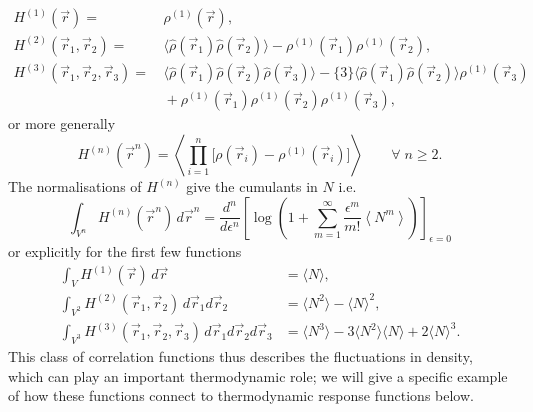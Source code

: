 \begin{subequations}\label{eq:density-density-correlations}
  \begin{align}
    H^{(1)}(\vec{r})
    =& \,
    \rho^{(1)}(\vec{r}),
    \\
    H^{(2)}(\vec{r}_1, \vec{r}_2)
    =& \,
    \big\langle \widehat\rho(\vec{r}_1) \widehat\rho(\vec{r}_2) \big\rangle
    - \rho^{(1)}(\vec{r}_1) \rho^{(1)}(\vec{r}_2),
    \label{eq:pair-density-density-correlation}
    \\
    H^{(3)}(\vec{r}_1, \vec{r}_2, \vec{r}_3)
    =& \,
    \big\langle \widehat\rho(\vec{r}_1) \widehat\rho(\vec{r}_2) \widehat\rho(\vec{r}_3) \big\rangle
    - \{3\} \big\langle \widehat\rho(\vec{r}_1) \widehat\rho(\vec{r}_2) \big\rangle \rho^{(1)}(\vec{r}_3)
    \nonumber \\ & \,
    + \rho^{(1)}(\vec{r}_1) \rho^{(1)}(\vec{r}_2) \rho^{(1)}(\vec{r}_3),
  \end{align}
\end{subequations}
or more generally \cite{Hansen2013}
\begin{equation}\label{eq:density-density-correlations}
  H^{(n)}(\vec{r}^n)
  =
  \left\langle
  \prod_{i=1}^n
  \Big[ \rho(\vec{r}_i) - \rho^{(1)}(\vec{r}_i) \Big]
  \right\rangle
  \qquad \forall \; n \ge 2.
\end{equation}
The normalisations of $H^{(n)}$ give the cumulants in $N$ i.e.\
\begin{equation*}
  \int_{V^n} H^{(n)}(\vec{r}^n) \, d\vec{r}^n
  =
  \frac{d^n}{d\epsilon^n}
  \left[
  \log{\left(
      1 + \sum_{m=1}^\infty
      \frac{\epsilon^m}{m!} \left\langle N^m \right\rangle
      \right)}
  \right]_{\epsilon = 0}
\end{equation*}
or explicitly for the first few functions
\begin{subequations}
  \begin{align}
    \int_V H^{(1)}(\vec{r}) \, d\vec{r}
    &=
    \langle N \rangle,
    \\
    \int_{V^2} H^{(2)}(\vec{r}_1, \vec{r}_2) \, d\vec{r}_1 d\vec{r}_2
    &=
    \langle N^2 \rangle - \langle N \rangle^2,
    \label{eq:pair-density-density-norm}
    \\
    \int_{V^3} H^{(3)}(\vec{r}_1, \vec{r}_2, \vec{r}_3) \, d\vec{r}_1 d\vec{r}_2 d\vec{r}_3
    &=
    \langle N^3 \rangle
    - 3 \langle N^2 \rangle \langle N \rangle
    + 2 \langle N \rangle^3.
  \end{align}
\end{subequations}
This class of correlation functions thus describes the fluctuations in density, which can play an important thermodynamic role; we will give a specific example of how these functions connect to thermodynamic response functions below.

